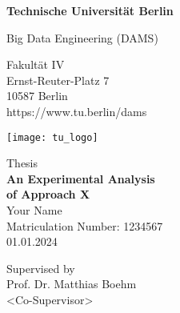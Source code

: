 \thispagestyle{empty}
\begin{center}

\vspace*{1.4cm}
{\LARGE \textbf{Technische Universität Berlin}}

\vspace{0.5cm}

{\large Big Data Engineering (DAMS)\\[1mm]}

Fakultät IV\\
Ernst-Reuter-Platz 7\\
10587 Berlin\\
https://www.tu.berlin/dams\\

\vspace*{1cm}

\texttt{[image: tu\_logo]}

\vspace*{1.0cm}

{\LARGE {} Thesis}\\ %

\vspace{1.0cm}
{\LARGE \textbf{An Experimental Analysis }}\\
\vspace*{0.3cm}
{\LARGE \textbf{of Approach X}}\\
\vspace*{1.0cm}
{\LARGE Your Name}
\\
\vspace*{0.5cm}
Matriculation Number: 1234567\\
01.01.2024\\ %
\vspace*{1.0cm}

Supervised by\\
Prof. Dr. Matthias Boehm \\
<Co-Supervisor>



\end{center}

